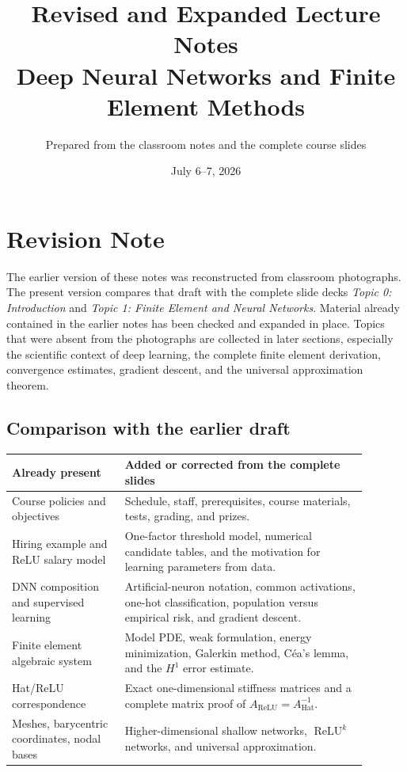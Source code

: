 \documentclass[11pt,a4paper]{article}
\title{\textbf{Revised and Expanded Lecture Notes\\Deep Neural Networks and Finite Element Methods}}
\author{Prepared from the classroom notes and the complete course slides}
\date{July 6--7, 2026}
\newcommand{\ReLU}{\operatorname{ReLU}}
\newcommand{\Ah}{A_{\mathrm{Hat}}}
\newcommand{\Ar}{A_{\mathrm{ReLU}}}
\theoremstyle{definition}
\theoremstyle{plain}
\theoremstyle{remark}
\begin{document}
\maketitle
\tableofcontents
\newpage

\section*{Revision Note}
The earlier version of these notes was reconstructed from classroom photographs. The present version compares that draft with the complete slide decks \emph{Topic 0: Introduction} and \emph{Topic 1: Finite Element and Neural Networks}. Material already contained in the earlier notes has been checked and expanded in place. Topics that were absent from the photographs are collected in later sections, especially the scientific context of deep learning, the complete finite element derivation, convergence estimates, gradient descent, and the universal approximation theorem.

\subsection*{Comparison with the earlier draft}
\begin{center}
\renewcommand{\arraystretch}{1.25}
\begin{tabular}{p{0.29\linewidth}p{0.60\linewidth}}
\toprule
\textbf{Already present} & \textbf{Added or corrected from the complete slides}\\
\midrule
Course policies and objectives & Schedule, staff, prerequisites, course materials, tests, grading, and prizes.\\
Hiring example and ReLU salary model & One-factor threshold model, numerical candidate tables, and the motivation for learning parameters from data.\\
DNN composition and supervised learning & Artificial-neuron notation, common activations, one-hot classification, population versus empirical risk, and gradient descent.\\
Finite element algebraic system & Model PDE, weak formulation, energy minimization, Galerkin method, C\'ea's lemma, and the $H^1$ error estimate.\\
Hat/ReLU correspondence & Exact one-dimensional stiffness matrices and a complete matrix proof of $\Ar=\Ah^{-1}$.\\
Meshes, barycentric coordinates, nodal bases & Higher-dimensional shallow networks, $\ReLU^k$ networks, and universal approximation.\\
\bottomrule
\end{tabular}
\end{center}
\end{document}
